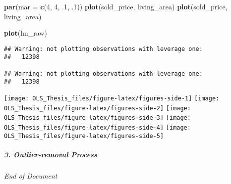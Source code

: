 \documentclass[
]{article}
\newenvironment{Shaded}{\begin{snugshade}}{\end{snugshade}}
\newcommand{\DataTypeTok}[1]{\textcolor[rgb]{0.13,0.29,0.53}{#1}}
\newcommand{\DecValTok}[1]{\textcolor[rgb]{0.00,0.00,0.81}{#1}}
\newcommand{\FloatTok}[1]{\textcolor[rgb]{0.00,0.00,0.81}{#1}}
\newcommand{\KeywordTok}[1]{\textcolor[rgb]{0.13,0.29,0.53}{\textbf{#1}}}
\newcommand{\NormalTok}[1]{#1}
\begin{document}
\begin{Shaded}
\begin{Highlighting}[]
\KeywordTok{par}\NormalTok{(}\DataTypeTok{mar =} \KeywordTok{c}\NormalTok{(}\DecValTok{4}\NormalTok{, }\DecValTok{4}\NormalTok{, }\FloatTok{.1}\NormalTok{, }\FloatTok{.1}\NormalTok{))}
\KeywordTok{plot}\NormalTok{(sold_price, living_area)}
\KeywordTok{plot}\NormalTok{(sold_price, living_area)}

\KeywordTok{plot}\NormalTok{(lm_raw)}
\end{Highlighting}
\end{Shaded}

\begin{verbatim}
## Warning: not plotting observations with leverage one:
##   12398

## Warning: not plotting observations with leverage one:
##   12398
\end{verbatim}

\texttt{[image: OLS\_Thesis\_files/figure-latex/figures-side-1]}
\texttt{[image: OLS\_Thesis\_files/figure-latex/figures-side-2]}
\texttt{[image: OLS\_Thesis\_files/figure-latex/figures-side-3]}
\texttt{[image: OLS\_Thesis\_files/figure-latex/figures-side-4]}
\texttt{[image: OLS\_Thesis\_files/figure-latex/figures-side-5]}

\hypertarget{outlier-removal-process}{%
\subparagraph{3. Outlier-removal
Process}\label{outlier-removal-process}}

\emph{End of Document}
\end{document}
